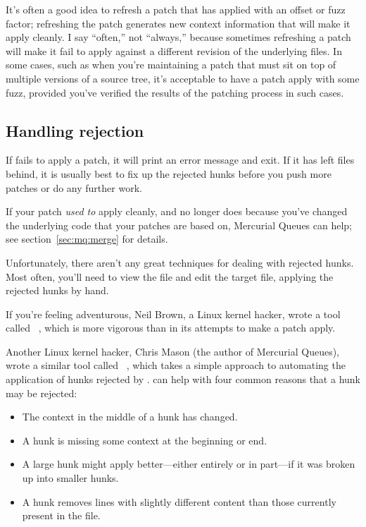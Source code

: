 It's often a good idea to refresh a patch that has applied with an
offset or fuzz factor; refreshing the patch generates new context
information that will make it apply cleanly.  I say ``often,'' not
``always,'' because sometimes refreshing a patch will make it fail to
apply against a different revision of the underlying files.  In some
cases, such as when you're maintaining a patch that must sit on top of
multiple versions of a source tree, it's acceptable to have a patch
apply with some fuzz, provided you've verified the results of the
patching process in such cases.

\subsection{Handling rejection}

If  fails to apply a patch, it will print an error
message and exit.  If it has left  files behind, it is
usually best to fix up the rejected hunks before you push more patches
or do any further work.

If your patch \emph{used to} apply cleanly, and no longer does because
you've changed the underlying code that your patches are based on,
Mercurial Queues can help; see section~\ref{sec:mq:merge} for details.

Unfortunately, there aren't any great techniques for dealing with
rejected hunks.  Most often, you'll need to view the 
file and edit the target file, applying the rejected hunks by hand.

If you're feeling adventurous, Neil Brown, a Linux kernel hacker,
wrote a tool called ~\cite{web:wiggle}, which is more
vigorous than  in its attempts to make a patch apply.

Another Linux kernel hacker, Chris Mason (the author of Mercurial
Queues), wrote a similar tool called ~\cite{web:rej},
which takes a simple approach to automating the application of hunks
rejected by .   can help with four common
reasons that a hunk may be rejected:

\begin{itemize}
\item The context in the middle of a hunk has changed.
\item A hunk is missing some context at the beginning or end.
\item A large hunk might apply better---either entirely or in
  part---if it was broken up into smaller hunks.
\item A hunk removes lines with slightly different content than those
  currently present in the file.
\end{itemize}

